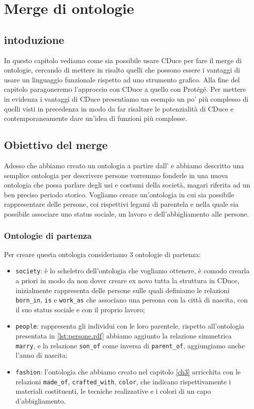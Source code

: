 \chapter{Merge di ontologie}
\label{ch4}
\section*{intoduzione}
In questo capitolo vediamo come sia possibile usare CDuce per fare il merge di ontologie, cercando di mettere in risalto quelli che possono essere i vantaggi di usare un linguaggio funzionale rispetto ad uno strumento grafico. Alla fine del capitolo paragoneremo l'approccio con CDuce a quello con Protégé. Per mettere in evidenza i vantaggi di CDuce presentiamo un esempio un po' più complesso di quelli visti in precedenza in modo da far risaltare le potenzialità di CDuce e contemporaneamente dare un'idea di funzioni più complesse.

\section{Obiettivo del merge}
Adesso che abbiamo creato un ontologia a partire dall' e abbiamo descritto una semplice ontologia per descrivere persone vorremmo fonderle in una nuova ontologia che possa parlare degli usi e costumi della società, magari riferita ad un ben preciso periodo storico. Vogliamo creare un'ontologia in cui sia possibile rappresentare delle persone, coi rispettivi legami di parentela e nella quale sia possibile associare uno status sociale, un lavoro e dell'abbigliamento alle persone.
\subsection{Ontologie di partenza}
Per creare questa ontologia consideriamo 3 ontologie di partenza:
\begin{itemize}
	\item \verb|society|: è lo scheletro dell'ontologia che vogliamo ottenere, è comodo crearla a priori in modo da non dover creare ex novo tutta la struttura in CDuce, inizialmente rappresenta delle persone sulle quali definiamo le relazioni \verb|born_in|, \verb|is| e \verb|work_as| che associano una persona con la città di nascita, con il suo status sociale e con il proprio lavoro;
	\item \verb|people|: rappresenta gli individui con le loro parentele, rispetto all'ontologia presentata in \ref{lst:persone.rdf} abbiamo aggiunto la relazione simmetrica \verb|marry|, e la relazione \verb|son_of| come inversa di \verb|parent_of|, aggiungiamo anche l'anno di nascita;
	\item \verb|fashion|: l'ontologia che abbiamo creato nel capitolo \ref{ch3} arricchita con le relazioni \verb|made_of|, \verb|crafted_with|, \verb|color|, che indicano rispettivamente i materiali costituenti, le tecniche realizzative e i colori di un capo d'abbigliamento.
\end{itemize}
